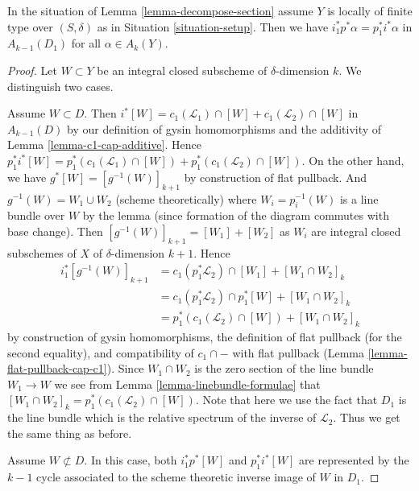 \begin{lemma}
\label{lemma-decompose-section-formulae}
In the situation of Lemma \ref{lemma-decompose-section}
assume $Y$ is locally of finite type over $(S, \delta)$ as in
Situation \ref{situation-setup}. Then we have
$i_1^*p^*\alpha = p_1^*i^*\alpha$
in $A_{k - 1}(D_1)$ for all $\alpha \in A_k(Y)$.
\end{lemma}

\begin{proof}
Let $W \subset Y$ be an integral closed subscheme of $\delta$-dimension $k$.
We distinguish two cases.

\medskip\noindent
Assume $W \subset D$. Then
$i^*[W] = c_1(\mathcal{L}_1) \cap [W] + c_1(\mathcal{L}_2) \cap [W]$
in $A_{k - 1}(D)$ by our definition of gysin homomorphisms and the
additivity of Lemma \ref{lemma-c1-cap-additive}.
Hence $p_1^*i^*[W] =
p_1^*(c_1(\mathcal{L}_1) \cap [W]) + p_1^*(c_1(\mathcal{L}_2) \cap [W])$.
On the other hand, we have
$g^*[W] = [g^{-1}(W)]_{k + 1}$ by construction of flat pullback.
And $g^{-1}(W) = W_1 \cup W_2$ (scheme theoretically)
where $W_i = p_i^{-1}(W)$ is a line bundle over $W$
by the lemma (since formation of the diagram commutes with base change).
Then $[g^{-1}(W)]_{k + 1} = [W_1] + [W_2]$ as $W_i$ are integral closed
subschemes of $X$ of $\delta$-dimension $k + 1$. Hence
\begin{align*}
i_1^*[g^{-1}(W)]_{k + 1}
& =
c_1(p_1^*\mathcal{L}_2) \cap [W_1] + [W_1 \cap W_2]_k \\
& =
c_1(p_1^*\mathcal{L}_2) \cap p_1^*[W] + [W_1 \cap W_2]_k \\
& =
p_1^*(c_1(\mathcal{L}_2) \cap [W]) + [W_1 \cap W_2]_k
\end{align*}
by construction of gysin homomorphisms, the definition of flat pullback
(for the second equality), and compatibility of $c_1 \cap -$
with flat pullback (Lemma \ref{lemma-flat-pullback-cap-c1}).
Since $W_1 \cap W_2$ is the zero section of the line bundle
$W_1 \to W$ we see from Lemma \ref{lemma-linebundle-formulae}
that $[W_1 \cap W_2]_k = p_1^*(c_1(\mathcal{L}_2) \cap [W])$.
Note that here we use the fact that $D_1$ is the line bundle
which is the relative spectrum of the inverse of $\mathcal{L}_2$.
Thus we get the same thing as before.

\medskip\noindent
Assume $W \not \subset D$. In this case, both $i_1^*p^*[W]$
and $p_1^*i^*[W]$ are represented by the $k - 1$ cycle associated
to the scheme theoretic inverse image of $W$ in $D_1$.
\end{proof}

